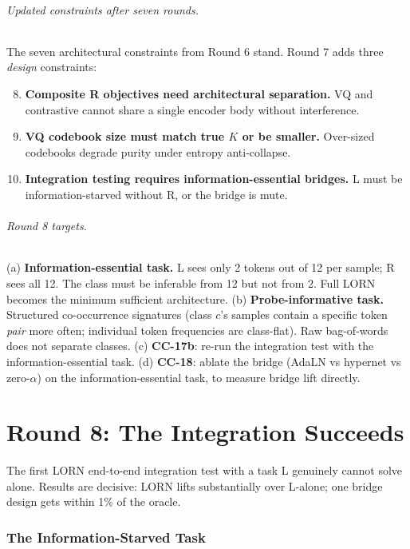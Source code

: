 \documentclass[10pt, twocolumn, a4paper]{article}
\begin{document}
\paragraph{Updated constraints after seven rounds.}
The seven architectural constraints from Round 6 stand. Round 7 adds three \emph{design} constraints:
\begin{enumerate}[nosep,leftmargin=*,resume]
\setcounter{enumi}{7}
\item \textbf{Composite R objectives need architectural separation.} VQ and contrastive cannot share a single encoder body without interference.
\item \textbf{VQ codebook size must match true $K$ or be smaller.} Over-sized codebooks degrade purity under entropy anti-collapse.
\item \textbf{Integration testing requires information-essential bridges.} L must be information-starved without R, or the bridge is mute.
\end{enumerate}

\paragraph{Round 8 targets.}
(a) \textbf{Information-essential task.} L sees only 2 tokens out of 12 per sample; R sees all 12. The class must be inferable from 12 but not from 2. Full LORN becomes the minimum sufficient architecture.
(b) \textbf{Probe-informative task.} Structured co-occurrence signatures (class $c$'s samples contain a specific token \emph{pair} more often; individual token frequencies are class-flat). Raw bag-of-words does not separate classes.
(c) \textbf{CC-17b}: re-run the integration test with the information-essential task.
(d) \textbf{CC-18}: ablate the bridge (AdaLN vs hypernet vs zero-$\alpha$) on the information-essential task, to measure bridge lift directly.


\part*{Round 8: The Integration Succeeds}

The first LORN end-to-end integration test with a task L genuinely cannot solve alone. Results are decisive: LORN lifts substantially over L-alone; one bridge design gets within 1\% of the oracle.

\section{The Information-Starved Task}
\end{document}
